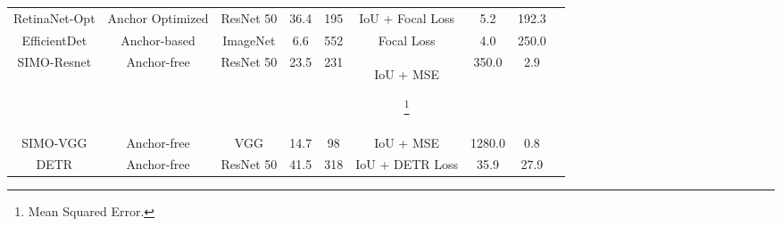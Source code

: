 \begin{table*}[h]
\begin{tabular}{|c|c|c|c|c|c|c|c|c|}
RetinaNet-Opt & Anchor Optimized & ResNet 50 & 36.4 & 195 & IoU + Focal Loss & 5.2 & 192.3  \\ 
EfficientDet & Anchor-based & ImageNet & 6.6 & 552 & Focal Loss & 4.0 & 250.0  \\ 
SIMO-Resnet & Anchor-free & ResNet 50 & 23.5 & 231 & IoU + MSE\begin{scriptsize}\footnote{Mean Squared Error.}\end{scriptsize} & 350.0 & 2.9  \\ 
SIMO-VGG & Anchor-free & VGG & 14.7 & 98 & IoU + MSE & 1280.0 & 0.8  \\ 
DETR & Anchor-free & ResNet 50 & 41.5 & 318 & IoU + DETR Loss & 35.9 & 27.9  \\ 
\hline
\end{tabular}
\end{table*}

